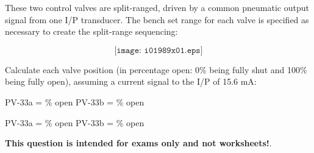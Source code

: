

These two control valves are split-ranged, driven by a common pneumatic output signal from one I/P transducer.  The bench set range for each valve is specified as necessary to create the split-range sequencing:

$$\texttt{[image: i01989x01.eps]}$$

Calculate each valve position (in percentage open: 0\% being fully shut and 100\% being fully open), assuming a current signal to the I/P of 15.6 mA:

\vskip 20pt

\hskip 50pt PV-33a = \underbar{\hskip 50pt} \% open \hskip 60pt PV-33b = \underbar{\hskip 50pt} \% open







PV-33a =  \% open \hskip 100pt PV-33b =  \% open







{\bf This question is intended for exams only and not worksheets!}.


